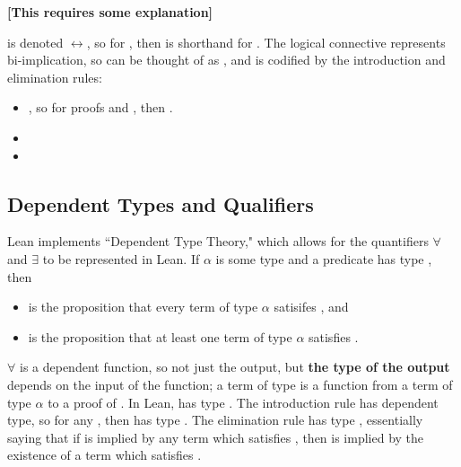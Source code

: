 \begin{description}
\begin{itemize}
        \textbf{[This requires some explanation]}
    \end{itemize}
    \item[\lean{Iff : Prop $\to$ Prop $\to$ Prop}] is denoted $\leftrightarrow$, so 
    for , then  is shorthand for 
    . The logical connective  represents 
    bi-implication, so  can be thought of as 
    , and is codified by the introduction
    and elimination rules: \begin{itemize}
        \item {}, so for
        proofs  and , then 
        .
        \item {}
        \item {}
    \end{itemize}

\end{description}


\subsection{Dependent Types and Qualifiers}

Lean implements ``Dependent Type Theory," which allows for the quantifiers
$\forall$ and $\exists$ to be represented in Lean. If $\alpha$ is some
type and a predicate  has type , then 
\begin{itemize}
    \item {} is the proposition that every 
    term of type $\alpha$ satisifes , and
    \item {} is the proposition that
    at least one term of type $\alpha$ satisfies .
\end{itemize}
$\forall$ is a dependent function, so not just the output, 
but \textbf{the type of the output} depends on the input of the function; 
a term of type  is a function from
a term  of type $\alpha$ to a proof of . In Lean,
 has type . The introduction
rule  has dependent type, so for any ,
then  has type . The elimination
rule  has type 
, essentially
saying that if  is implied by any term which satisfies , then 
 is implied by the existence of a term which satisfies .

